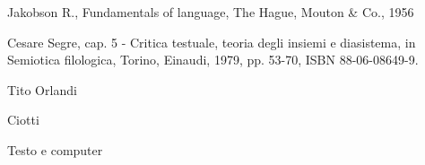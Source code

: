 Jakobson R., Fundamentals of language, The Hague, Mouton & Co., 1956

Cesare Segre, cap. 5 - Critica testuale, teoria degli insiemi e diasistema, in Semiotica filologica, Torino, Einaudi, 1979, pp. 53-70, ISBN 88-06-08649-9.

Tito Orlandi

Ciotti

Testo e computer